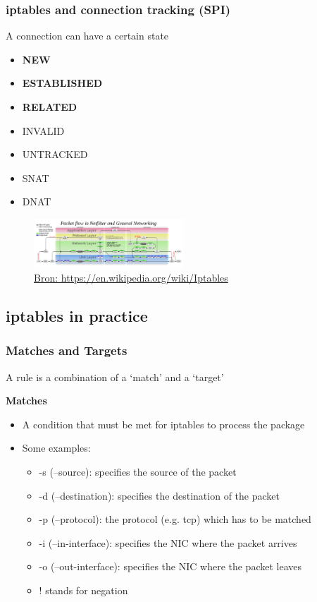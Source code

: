\documentclass{article}
\begin{document}
\subsubsection{iptables and connection tracking (SPI)}

A connection can have a certain state

\begin{itemize}
    \item \textbf{NEW}
    \item \textbf{ESTABLISHED}
    \item \textbf{RELATED}
    \item INVALID
    \item UNTRACKED
    \item SNAT
    \item DNAT
\end{itemize}

\begin{figure}[H]
    \centering
    \includegraphics[width=0.5\textwidth]{packet-flow-netfilter.png}
    \caption{\url{Bron: https://en.wikipedia.org/wiki/Iptables}}
\end{figure}

\subsection{iptables in practice}

\subsubsection{Matches and Targets}

A rule is a combination of a `match' and a `target'

\textbf{Matches}

\begin{itemize}
    \item A condition that must be met for iptables to process the package
    \item Some examples:
    \begin{itemize}
        \item -s (--source): specifies the source of the packet
        \item -d (--destination): specifies the destination of the packet
        \item -p (--protocol): the protocol (e.g. tcp) which has to be matched
        \item -i (--in-interface): specifies the NIC where the packet arrives
        \item -o (--out-interface): specifies the NIC where the packet leaves
        \item ! stands for negation
    \end{itemize}
\end{itemize}
\end{document}
